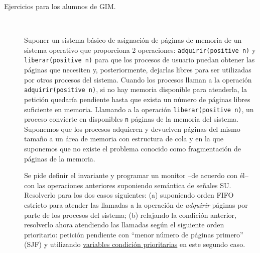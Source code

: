 \documentclass[12pt]{article}
\begin{document}
\begin{description}
        \item [Ejercicios para los alumnos de GIM.]~\\
            \begin{ejercicio}
                Suponer un sistema básico de asignación de páginas de memoria de un sistema operativo que proporciona 2 operaciones: \verb|adquirir(positive n)| y \verb|liberar(positive n)| para que los procesos de usuario puedan obtener las páginas que necesiten y, posteriormente, dejarlas libres para ser utilizadas por otros procesos del sistema. Cuando los procesos llaman a la operación \verb|adquirir(positive n)|, si no hay memoria disponible para atenderla, la petición quedaría pendiente hasta que exista un número de páginas libres suficiente en memoria. Llamando a la operación \verb|liberar(positive n)|, un proceso convierte en disponibles \verb|n| páginas de la memoria del sistema. Suponemos que los procesos adquieren y devuelven páginas del mismo tamaño a un área de memoria con estructura de cola y en la que suponemos que no existe el problema conocido como fragmentación de páginas de la memoria.

                \noindent
                Se pide definir el invariante y programar un monitor –de acuerdo con él– con las operaciones anteriores suponiendo semántica de señales SU\@. Resolverlo para los dos casos siguientes: (a) suponiendo orden FIFO estricto para atender las llamadas a la operación de \textit{adquirir} páginas por parte de los procesos del sistema; (b) relajando la condición anterior, resolverlo ahora atendiendo las llamadas según el siguiente orden prioritario: petición pendiente con ``menor número de páginas primero'' (SJF) y utilizando \underline{variables condición prioritarias} en este segundo caso.
            \end{ejercicio}


\end{description}
\end{document}
